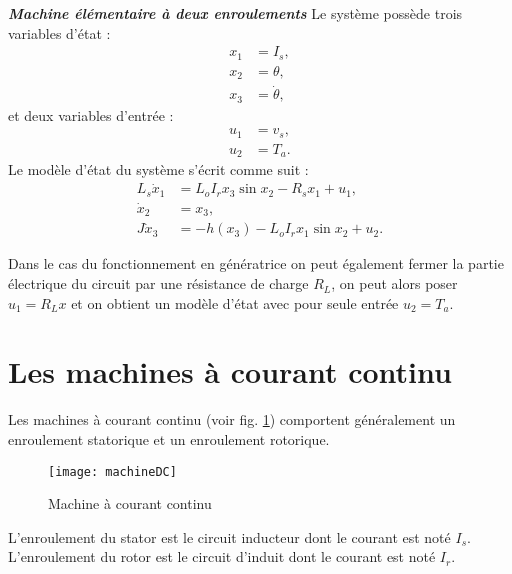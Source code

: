 \begin{exemple}{\bf \em Machine élémentaire à deux enroulements}
Le système possède trois variables d'état :
\begin{equation*} \begin{split}
x_1 &= I_s, \\
x_2 &= \theta, \\
x_3 &= \dot \theta,
\end{split} \end{equation*}
et deux variables d'entrée :
\begin{equation*} \begin{split}
u_1 &= v_s, \\
u_2 &= T_a.
\end{split} \end{equation*}
Le modèle d'état du système s'écrit comme suit :
\begin{align*}
L_s\dot x_1 &= L_oI_rx_3 \sin x_2 - R_s x_1 + u_1, \\
\dot x_2 &= x_3, \\
J\dot x_3 &= -h(x_3) - L_oI_rx_1 \sin x_2 + u_2.
\end{align*}

Dans le cas du fonctionnement en génératrice on peut également fermer la partie électrique du circuit par une résistance de charge $R_L$, on peut alors poser $u_1=R_L x$ et on obtient un modèle d'état avec pour seule entrée $u_2=T_a$.

\cqfd



\end{exemple}

\section{Les machines à courant continu}


Les machines à courant continu (voir fig.
\ref{fig:machineDC}) comportent généralement un enroulement statorique
et un enroulement rotorique.  
\begin{figure}[t]
\begin{center}
\texttt{[image: machineDC]}
\caption{Machine à courant continu}
\label{fig:machineDC}
\end{center}
\end{figure}
L'enroulement du stator est le circuit
inducteur dont le courant est noté $I_s$.  L'enroule\-ment du rotor
est le circuit d'induit dont le courant est noté $I_r$. 

